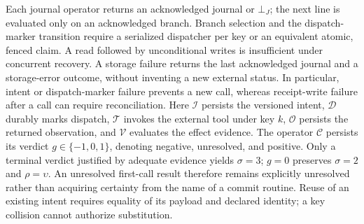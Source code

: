 Each journal operator returns an acknowledged journal or $\bot_J$; the next line is evaluated only on an acknowledged branch. Branch selection and the dispatch-marker transition require a serialized dispatcher per key or an equivalent atomic, fenced claim. A read followed by unconditional writes is insufficient under concurrent recovery. A storage failure returns the last acknowledged journal and a storage-error outcome, without inventing a new external status. In particular, intent or dispatch-marker failure prevents a new call, whereas receipt-write failure after a call can require reconciliation. Here $\mathcal I$ persists the versioned intent, $\mathcal D$ durably marks dispatch, $\mathcal T$ invokes the external tool under key $k$, $\mathcal O$ persists the returned observation, and $\mathcal V$ evaluates the effect evidence. The operator $\mathcal C$ persists its verdict $g\in\{-1,0,1\}$, denoting negative, unresolved, and positive. Only a terminal verdict justified by adequate evidence yields $\sigma=3$; $g=0$ preserves $\sigma=2$ and $\rho=\upsilon$. An unresolved first-call result therefore remains explicitly unresolved rather than acquiring certainty from the name of a commit routine. Reuse of an existing intent requires equality of its payload and declared identity; a key collision cannot authorize substitution.

